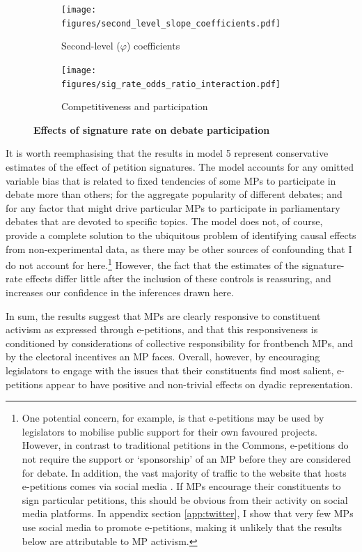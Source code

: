 \documentclass[12pt]{article}
\begin{document}
\begin{figure}[t]
\centering

\begin{subfigure}[b]{.49\textwidth}
\caption{Second-level ($\varphi$) coefficients}
\texttt{[image: figures/second\_level\_slope\_coefficients.pdf]}

\end{subfigure}
\begin{subfigure}[b]{.49\textwidth}
\caption{Competitiveness and participation}
\texttt{[image: figures/sig\_rate\_odds\_ratio\_interaction.pdf]}

\end{subfigure}
\caption{\label{fig:subnationalmargins} \textbf{Effects of signature rate on debate participation} }
\end{figure}

It is worth reemphasising that the results in model 5 represent conservative estimates of the effect of petition signatures. The model accounts for any omitted variable bias that is related to fixed tendencies of some MPs to participate in debate more than others; for the aggregate popularity of different debates; and for any factor that might drive particular MPs to participate in parliamentary debates that are devoted to specific topics. The model does not, of course, provide a complete solution to the ubiquitous problem of identifying causal effects from non-experimental data, as there may be other sources of confounding that I do not account for here.\footnote{One potential concern, for example, is that e-petitions may be used by legislators to mobilise public support for their own favoured projects. However, in contrast to traditional petitions in the Commons, e-petitions do not require the support or `sponsorship' of an MP before they are considered for debate. In addition, the vast majority of traffic to the website that hosts e-petitions comes via social media \citep[11]{yasseri2017rapid}. If MPs encourage their constituents to sign particular petitions, this should be obvious from their activity on social media platforms. In appendix section \ref{app:twitter}, I show that very few MPs use social media to promote e-petitions, making it unlikely that the results below are attributable to MP activism.}  However, the fact that the estimates of the signature-rate effects differ little after the inclusion of these controls is reassuring, and increases our confidence in the inferences drawn here.

In sum, the results suggest that MPs are clearly responsive to constituent activism as expressed through e-petitions, and that this responsiveness is conditioned by considerations of collective responsibility for frontbench MPs, and by the electoral incentives an MP faces. Overall, however, by encouraging legislators to engage with the issues that their constituents find most salient, e-petitions appear to have positive and non-trivial effects on dyadic representation. 
\end{document}
